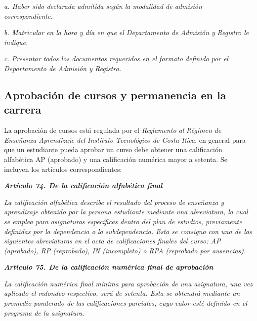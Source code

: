 \textit{a. Haber sido declarada admitida según la modalidad de admisión}\textit{ }\textit{correspondiente.}\par

\textit{b. Matricular en la hora y día en que el Departamento de Admisión y}\textit{ }\textit{Registro le indique.}\par

\textit{c. Presentar todos los documentos requeridos en el formato definido}\textit{ }\textit{por el Departamento de Admisión y Registro.}\par

\subsection*{Aprobación de cursos y permanencia en la carrera}

La aprobación de cursos está regulada por el \textit{Reglamento al}\textit{ R}\textit{égimen de }\textit{E}\textit{nseñanza}\textit{-}\textit{A}\textit{pre}\textit{ndizaje del Instituto Tecnológico de Costa Rica}, en general para que un estudiante pueda aprobar un curso debe obtener una calificación alfabética AP (aprobado) y una calificación numérica mayor a setenta. Se incluyen los artículos correspondientes:\par

\textit{\textbf{Artículo 74. De la calificación alfabética final }}\par

\textit{La calificación alfabética describe el resultado del proceso de enseñanza y aprendizaje obtenido por la persona estudiante mediante una abreviatura, la cual se emplea para asignaturas específicas dentro del plan de estudios, previamente definidas por la dependencia o la }\textit{subdependencia}\textit{. Esta se consigna }\textit{con una de las siguientes abreviaturas en el acta de calificaciones finales del curso: AP (aprobado), RP (reprobado), IN (incompleto) o RPA (reprobado por ausencias).   }\par

\textit{\textbf{Artículo 75. De la calificación numérica final de aprobación   }}\par

\textit{La calificación numérica final mínima para aprobación de una asignatura, una vez aplicado el redondeo respectivo, será de setenta. Esta se obtendrá mediante un promedio ponderado de las calificaciones parciales, cuyo valor esté definido en el programa de la asignatura.  }\par

